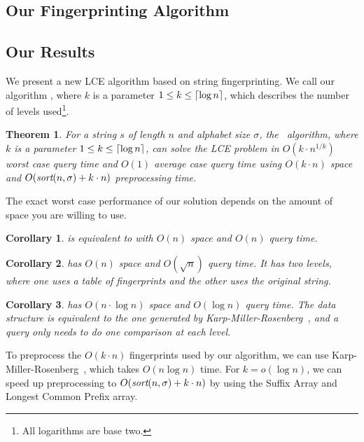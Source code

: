 \documentclass[a4]{article}
\newtheorem{theorem}{Theorem}
\newtheorem{corollary}{Corollary}
\begin{document}
\ifreport
\subsection{Our Fingerprinting Algorithm}
\fi %
\ifarticle
\subsection{Our Results}
\fi %

We present a new LCE algorithm based on string fingerprinting. We call our algorithm \fprintk, where $k$ is a parameter $1\leq k\leq\lceil\log n\rceil$, which describes the number of levels used\footnote{All logarithms are base two.}.

\begin{theorem}
For a string $s$ of length $n$ and alphabet size $\sigma$, the \fprintk\ algorithm, where $k$ is a parameter $1 \leq k \leq \lceil\log n\rceil$, can solve the LCE problem in $O(k\cdot n^{1/k})$ worst case query time and $O(1)$ average case query time using $O(k\cdot n)$ space and $O(\textit{sort}(n,\sigma) + k\cdot n)$ preprocessing time.
\end{theorem}

The exact worst case performance of our solution depends on the amount of space you are willing to use.

\begin{corollary}
\fprint[1] is equivalent to  with $O(n)$ space and $O(n)$ query time.
\end{corollary}

\begin{corollary}
\fprint[2] has $O(n)$ space and $O(\sqrt n)$ query time. It has two levels, where one uses a table of fingerprints and the other uses the original string.
\end{corollary}

\begin{corollary}
\fprint[\logceil] has $O(n\cdot\log n)$ space and $O(\log n)$ query time. The data structure is equivalent to the one generated by Karp-Miller-Rosenberg~\cite{karp-miller-rosenberg}, and a query only needs to do one comparison at each level.
\end{corollary}

To preprocess the $O(k\cdot n)$ fingerprints used by our algorithm, we can use Karp-Miller-Rosenberg~\cite{karp-miller-rosenberg}, which takes $O(n\log n)$ time. For $k=o(\log n)$, we can speed up preprocessing to $O(\textit{sort}(n,\sigma) + k\cdot n)$ by using the Suffix Array and Longest Common Prefix array.
\end{document}
